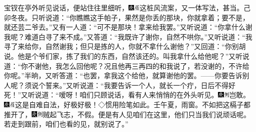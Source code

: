 宝钗在亭外听见说话，便站住往里细听，{\includegraphics[width=3mm]{../Images/00004}\includegraphics[width=3mm]{../Images/00010}\footnotesize \kaishu 这桩风流案，又一体写法，甚当。己卯冬夜。}只听说道：``你瞧瞧这手帕子，果然是你丢的那块，你就拿着；要不是，就还芸二爷去。''又有一人道：``可不是那块！拿来给我罢。''又听说道：``你拿什么谢我呢？难道白寻了来不成。''又答道：``我既许了谢你，自然不哄你。''又听说道：``我寻了来给你，自然谢我；但只是拣的人，你就不拿什么谢他？''又回道：``你别胡说。他是个爷们家，拣了我们的东西，自然该还的。叫我拿什么给他呢？''又听说道：``你不谢他，我怎么回他呢？况且他再三再四的和我说了，若没谢的，不许给你呢。''半晌，又听答道：``也罢，拿我这个给他，就算谢他的罢。------你要告诉别人呢？须说个誓来。''又听说道：``我要告诉一个人，就长一个疔，日后不得好死！''又听说道：``嗳呀！咱们只顾说话，看有人来悄悄的在外头听见。{\includegraphics[width=3mm]{../Images/00004}\includegraphics[width=3mm]{../Images/00011}\footnotesize \kaishu 岂敢。　\includegraphics[width=3mm]{../Images/00004}\includegraphics[width=3mm]{../Images/00010}\footnotesize \kaishu 这是自难自法，好极好极！◇惯用险笔如此。壬午夏，雨窗。}不如把这槅子都推开了，{\includegraphics[width=3mm]{../Images/00004}\includegraphics[width=3mm]{../Images/00011}\footnotesize \kaishu 贼起飞志，不假。}便是有人见咱们在这里，他们只当我们说顽话呢。若走到跟前，咱们也看的见，就别说了。''


